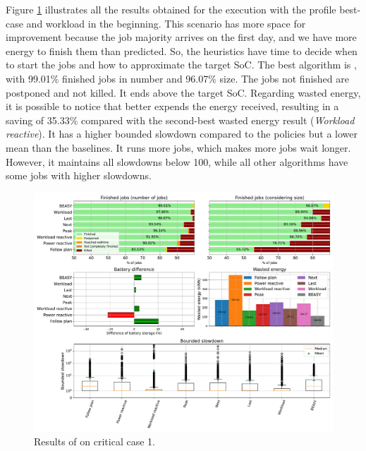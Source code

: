 Figure \ref{fig:beasy_critical_1} illustrates all the results obtained for the execution with the profile best-case and workload in the beginning. This scenario has more space for improvement because the job majority arrives on the first day, and we have more energy to finish them than predicted. So, the heuristics have time to decide when to start the jobs and how to approximate the target SoC. The best algorithm is \emph{\systemName}, with 99.01\% finished jobs in number and 96.07\% size. The jobs not finished are postponed and not killed. It ends above the target SoC. Regarding wasted energy, it is possible to notice that \emph{\systemName} better expends the energy received, resulting in a saving of 35.33\% compared with the second-best wasted energy result (\emph{Workload reactive}). It has a higher bounded slowdown compared to the policies but a lower mean than the baselines. It runs more jobs, which makes more jobs wait longer. However, it maintains all slowdowns below 100, while all other algorithms have some jobs with higher slowdowns.

\begin{figure}[!htb]
    \centering
    \includegraphics[scale=0.39]{Images/Heuristic/profile_best_workload_1_with_noise.pdf}
    \caption{Results of \emph{\systemName} on critical case 1.}
    \label{fig:beasy_critical_1}
\end{figure}

